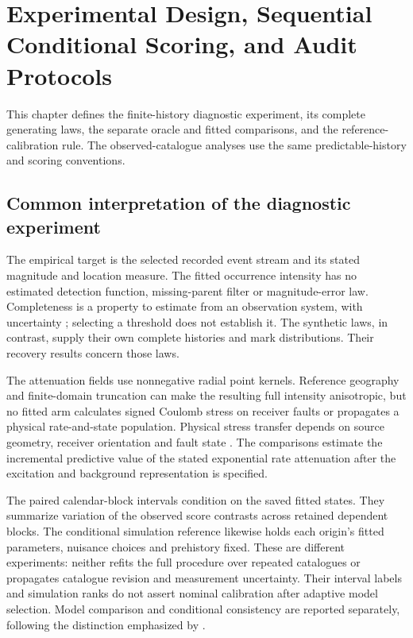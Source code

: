 \chapter{Experimental Design, Sequential Conditional Scoring, and Audit Protocols}\label{chap:design}
\label{ch:design}

This chapter defines the finite-history diagnostic experiment, its complete generating laws, the separate oracle and fitted comparisons, and the reference-calibration rule. The observed-catalogue analyses use the same predictable-history and scoring conventions.

\section{Common interpretation of the diagnostic experiment}
\label{sec:diagnostic_scope}

The empirical target is the selected recorded event stream and its stated
magnitude and location measure. The fitted occurrence intensity has no
estimated detection function, missing-parent filter or magnitude-error law.
Completeness is a property to estimate from an observation system, with
uncertainty \citep{WoessnerWiemer2005,Mignan2012}; selecting a threshold does
not establish it. The synthetic laws, in contrast, supply their own complete
histories and mark distributions. Their recovery results concern those laws.

The attenuation fields use nonnegative radial point kernels. Reference
geography and finite-domain truncation can make the resulting full intensity
anisotropic, but no fitted arm calculates signed Coulomb stress on receiver
faults or propagates a physical rate-and-state population. Physical stress
transfer depends on source geometry, receiver orientation and fault state
\citep{Dieterich1994,KingSteinLin1994,HarrisSimpson1998}. The comparisons
estimate the incremental predictive value of the stated exponential rate
attenuation after the excitation and background representation is specified.

The paired calendar-block intervals condition on the saved fitted states.
They summarize variation of the observed score contrasts across retained
dependent blocks. The conditional simulation reference likewise holds each
origin's fitted parameters, nuisance choices and prehistory fixed. These are
different experiments: neither refits the full procedure over repeated
catalogues or propagates catalogue revision and measurement uncertainty.
Their interval labels and simulation ranks do not assert nominal calibration
after adaptive model selection. Model comparison and conditional consistency
are reported separately, following the distinction emphasized by
\citet{RhoadesEtAl2011,BraySchoenberg2013}.


